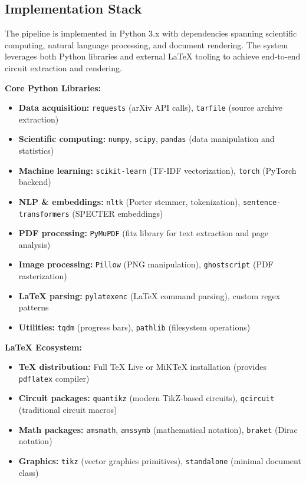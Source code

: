 \documentclass[9pt,a4paper,twoside]{rho-class/rho}
\begin{document}
\subsection{Implementation Stack}

The pipeline is implemented in Python 3.x with dependencies spanning scientific computing, natural language processing, and document rendering. The system leverages both Python libraries and external LaTeX tooling to achieve end-to-end circuit extraction and rendering.

\textbf{Core Python Libraries:}
\begin{itemize}
    \item \textbf{Data acquisition:} \texttt{requests} (arXiv API calls), \texttt{tarfile} (source archive extraction)
    \item \textbf{Scientific computing:} \texttt{numpy}, \texttt{scipy}, \texttt{pandas} (data manipulation and statistics)
    \item \textbf{Machine learning:} \texttt{scikit-learn} (TF-IDF vectorization), \texttt{torch} (PyTorch backend)
    \item \textbf{NLP \& embeddings:} \texttt{nltk} (Porter stemmer, tokenization), \texttt{sentence-transformers} (SPECTER embeddings)
    \item \textbf{PDF processing:} \texttt{PyMuPDF} (fitz library for text extraction and page analysis)
    \item \textbf{Image processing:} \texttt{Pillow} (PNG manipulation), \texttt{ghostscript} (PDF rasterization)
    \item \textbf{LaTeX parsing:} \texttt{pylatexenc} (LaTeX command parsing), custom regex patterns
    \item \textbf{Utilities:} \texttt{tqdm} (progress bars), \texttt{pathlib} (filesystem operations)
\end{itemize}

\textbf{LaTeX Ecosystem:}
\begin{itemize}
    \item \textbf{TeX distribution:} Full TeX Live or MiKTeX installation (provides \texttt{pdflatex} compiler)
    \item \textbf{Circuit packages:} \texttt{quantikz} (modern TikZ-based circuits), \texttt{qcircuit} (traditional circuit macros)
    \item \textbf{Math packages:} \texttt{amsmath}, \texttt{amssymb} (mathematical notation), \texttt{braket} (Dirac notation)
    \item \textbf{Graphics:} \texttt{tikz} (vector graphics primitives), \texttt{standalone} (minimal document class)
\end{itemize}
\end{document}
